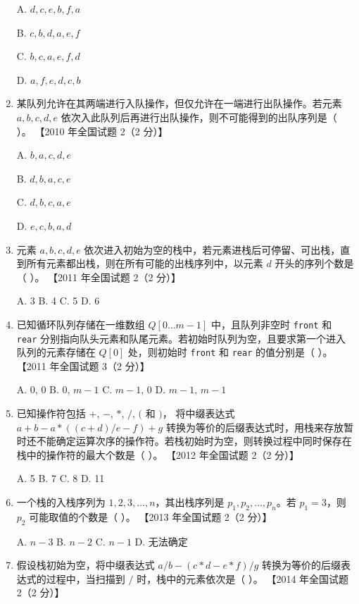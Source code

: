 \documentclass[lang=cn,newtx,10pt,scheme=chinese]{../../elegantbook}
\begin{document}
\begin{enumerate}
    A. $d, c, e, b,f, a$  

    B. $c, b, d, a, e,f$  

    C. $b,c, a, e,f, d $  

    D. $a,f,e,d,c,b$  

    \item 某队列允许在其两端进行入队操作，但仅允许在一端进行出队操作。若元素 $a, b, c, d, e$ 依次入此队列后再进行出队操作，则不可能得到的出队序列是（ ）。  
    【2010 年全国试题 2（2 分）】  

    A. $b, a, c, d, e$  

    B. $d, b, a, c, e$  

    C. $d,b,c,a,e$  

    D. $e, c, b, a, d$  

    \item 元素 $a, b, c, d, e$ 依次进入初始为空的栈中，若元素进栈后可停留、可出栈，直到所有元素都出栈，则在所有可能的出栈序列中，以元素 $d$ 开头的序列个数是（ ）。  
    【2011 年全国试题 2（2 分）】  

    A. 3 \quad B. 4 \quad C. 5 \quad D. 6  

    \item 已知循环队列存储在一维数组 $Q[0 \ldots m-1]$ 中，且队列非空时 \texttt{front} 和 \texttt{rear} 分别指向队头元素和队尾元素。若初始时队列为空，且要求第一个进入队列的元素存储在 $Q[0]$ 处，则初始时 \texttt{front} 和 \texttt{rear} 的值分别是（ ）。  
    【2011 年全国试题 3（2 分）】  

    A. 0, 0 \quad B. 0, $m-1$ \quad C. $m-1$, 0 \quad D. $m-1$, $m-1$  

    \item 已知操作符包括 $+$, $-$, $*$, $/$, $($ 和 $)$，
    将中缀表达式 $a+b-a*((c+d)/e-f)+g$ 转换为等价的后缀表达式时，用栈来存放暂时还不能确定运算次序的操作符。若栈初始时为空，则转换过程中同时保存在栈中的操作符的最大个数是（ ）。  
    【2012 年全国试题 2（2 分）】

    A. 5 \quad B. 7 \quad C. 8 \quad D. 11  

    \item 一个栈的入栈序列为 $1, 2, 3, \ldots, n$，其出栈序列是 $p_1, p_2, \ldots, p_n$。若 $p_1 = 3$，则 $p_2$ 可能取值的个数是（ ）。  
    【2013 年全国试题 2（2 分）】 

    A. $n-3$ \quad B. $n-2$ \quad C. $n-1$ \quad D. 无法确定  

    \item 假设栈初始为空，将中缀表达式 $a/b-(c*d-e*f)/g$ 转换为等价的后缀表达式的过程中，当扫描到 $/$ 时，栈中的元素依次是（ ）。  
    【2014 年全国试题 2（2 分）】  


\end{enumerate}
\end{document}
